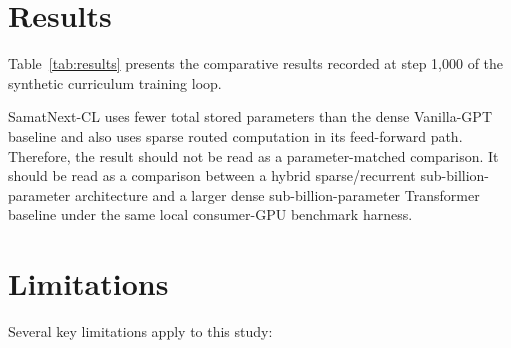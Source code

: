 \documentclass[11pt,a4paper]{article}
\begin{document}
\section{Results}
Table~\ref{tab:results} presents the comparative results recorded at step 1,000 of the synthetic curriculum training loop.

\begin{table}[h]
\centering
\small
{}
\caption{Comparative performance at step 1,000 of the synthetic curriculum benchmark. FLOP values represent architecture-specific analytical active-path estimates. They are not profiler-measured executed FLOPs for the current PyTorch implementation. VRAM refers to peak allocated memory in the local benchmark configuration.}
\label{tab:results}
\end{table}

SamatNext-CL uses fewer total stored parameters than the dense Vanilla-GPT baseline and also uses sparse routed computation in its feed-forward path. Therefore, the result should not be read as a parameter-matched comparison. It should be read as a comparison between a hybrid sparse/recurrent sub-billion-parameter architecture and a larger dense sub-billion-parameter Transformer baseline under the same local consumer-GPU benchmark harness.

\section{Limitations}
Several key limitations apply to this study:
\end{document}
